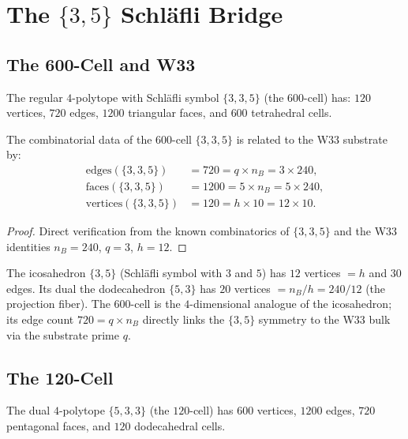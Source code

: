 \section{The $\{3,5\}$ Schl\"afli Bridge}\label{sec:schlafli}

\subsection{The 600-Cell and W33}

The regular $4$-polytope with Schl\"afli symbol $\{3,3,5\}$
(the $600$-cell) has:
$120$ vertices, $720$ edges, $1200$ triangular faces, and $600$ tetrahedral cells.

\begin{theorem}\label{thm:schlafli}
The combinatorial data of the $600$-cell $\{3,3,5\}$ is related
to the W33 substrate by:
\begin{align}
\text{edges}(\{3,3,5\}) &= 720 = q \times n_B = 3 \times 240, \\
\text{faces}(\{3,3,5\}) &= 1200 = 5 \times n_B = 5 \times 240, \\
\text{vertices}(\{3,3,5\}) &= 120 = h \times 10 = 12 \times 10.
\end{align}
\end{theorem}

\begin{proof}
Direct verification from the known combinatorics of $\{3,3,5\}$
and the W33 identities $n_B = 240$, $q = 3$, $h = 12$.\end{proof}

\begin{remark}
The icosahedron $\{3,5\}$ (Schl\"afli symbol with $3$ and $5$)
has $12$ vertices $= h$ and $30$ edges. Its dual the dodecahedron
$\{5,3\}$ has $20$ vertices $= n_B/h = 240/12$ (the projection fiber).
The $600$-cell is the $4$-dimensional analogue of the icosahedron;
its edge count $720 = q \times n_B$ directly links the $\{3,5\}$ symmetry
to the W33 bulk via the substrate prime $q$.
\end{remark}

\subsection{The 120-Cell}

The dual $4$-polytope $\{5,3,3\}$ (the $120$-cell) has
$600$ vertices, $1200$ edges, $720$ pentagonal faces, and $120$ dodecahedral cells.

